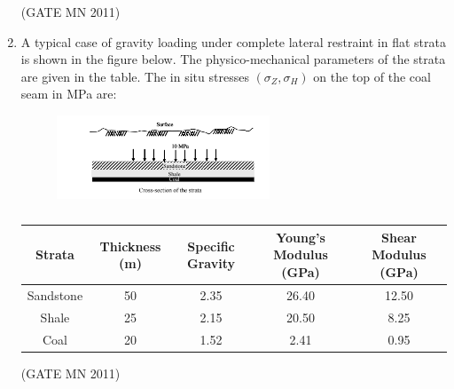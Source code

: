 \documentclass[journal]{IEEEtran}
\begin{document}
\begin{enumerate}
\hfill(GATE MN 2011)
\begin{enumerate}
\end{enumerate}

\item A typical case of gravity loading under complete lateral restraint in flat strata is shown in the figure below. The physico-mechanical parameters of the strata are given in the table. The in situ stresses $(\sigma_Z, \sigma_H)$ on the top of the coal seam in MPa are:


\begin{figure}[H]
    \centering
\includegraphics[width=0.6\textwidth]{Screenshot_2025_0813_193403.png} 
\caption{}
    \label{fig:Q35}
    \end{figure}
\begin{table}[H]
\centering
	\small
\begin{tabular}{|c|c|c|c|c|}
\hline
\textbf{Strata} & \textbf{Thickness (m)} & \textbf{Specific Gravity} & \textbf{Young's  Modulus (GPa)} & \textbf{Shear Modulus (GPa)} \\
\hline
Sandstone & 50 & 2.35 & 26.40 & 12.50 \\
\hline
Shale & 25 & 2.15 & 20.50 & 8.25 \\
\hline
Coal & 20 & 1.52 & 2.41 & 0.95 \\
\hline

\end{tabular}
\caption{}
    \label{tab:Q35}


	\hfill(GATE MN 2011)

\end{table}
\begin{enumerate}
\end{enumerate}




\end{enumerate}
\end{document}

